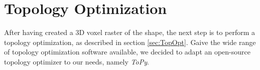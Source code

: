 \section{Topology Optimization}
\label{sec:ToPy}
After having created a 3D voxel raster of the shape, the next step is to perform a topology optimization, as described in section \ref{sec:TopOpt}. 
Gaive the wide range of topology optimization software available, we decided to adapt an open-source topology optimizer to our needs, namely \emph{ToPy}.







